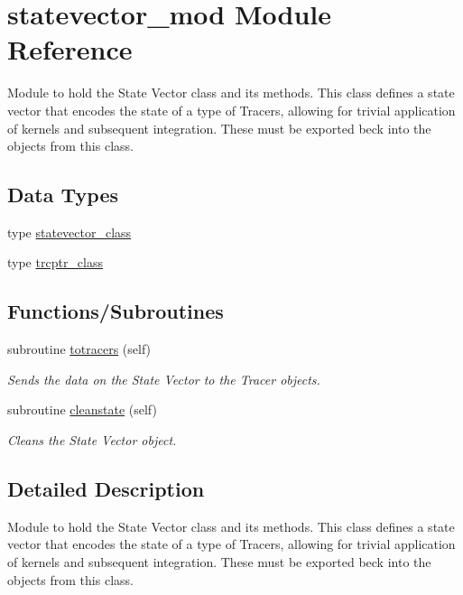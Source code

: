 \hypertarget{namespacestatevector__mod}{}\section{statevector\+\_\+mod Module Reference}
\label{namespacestatevector__mod}


Module to hold the State Vector class and its methods. This class defines a state vector that encodes the state of a type of Tracers, allowing for trivial application of kernels and subsequent integration. These must be exported beck into the objects from this class.  


\subsection*{Data Types}
\begin{DoxyCompactItemize}
\item 
type \mbox{\hyperlink{structstatevector__mod_1_1statevector__class}{statevector\+\_\+class}}
\item 
type \mbox{\hyperlink{structstatevector__mod_1_1trcptr__class}{trcptr\+\_\+class}}
\end{DoxyCompactItemize}
\subsection*{Functions/\+Subroutines}
\begin{DoxyCompactItemize}
\item 
subroutine \mbox{\hyperlink{namespacestatevector__mod_af0831dbae02e8ec94c576224cae673e5}{totracers}} (self)
\begin{DoxyCompactList}\small\item\em Sends the data on the State Vector to the Tracer objects. \end{DoxyCompactList}\item 
subroutine \mbox{\hyperlink{namespacestatevector__mod_acb2d2a7c4c5ee5d86a601be7db58c1df}{cleanstate}} (self)
\begin{DoxyCompactList}\small\item\em Cleans the State Vector object. \end{DoxyCompactList}\end{DoxyCompactItemize}


\subsection{Detailed Description}
Module to hold the State Vector class and its methods. This class defines a state vector that encodes the state of a type of Tracers, allowing for trivial application of kernels and subsequent integration. These must be exported beck into the objects from this class. 

